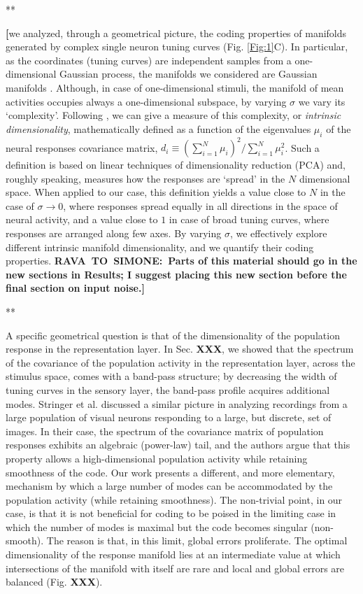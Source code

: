 \documentclass[a4paper]{article}%
\begin{document}
**

\textbf{[}we analyzed, through a geometrical picture, the coding properties of
manifolds generated by complex single neuron tuning curves (Fig.
\ref{Fig:1}C). In particular, as the coordinates (tuning curves) are
independent samples from a one-dimensional Gaussian process, the manifolds we
considered are Gaussian manifolds \cite{Lahiri2016RandomManifolds}. Although,
in case of one-dimensional stimuli, the manifold of mean activities occupies
always a one-dimensional subspace, by varying $\sigma$ we vary its
`complexity'. Following \cite{Gao2017AMeasurement}, we can give a measure of
this complexity, or \emph{intrinsic dimensionality}, mathematically defined as
a function of the eigenvalues $\mu_{i}$ of the neural responses covariance
matrix, $d_{i}\equiv(\sum_{i=1}^{N}\mu_{i})^{2}/\sum_{i=1}^{N}\mu_{i}^{2}$.
Such a definition is based on linear techniques of dimensionality reduction
(PCA) and, roughly speaking, measures how the responses are `spread' in the
$N$ dimensional space. When applied to our case, this definition yields a
value close to $N$ in the case of $\sigma\rightarrow0$, where responses spread
equally in all directions in the space of neural activity, and a value close
to $1$ in case of broad tuning curves, where responses are arranged along few
axes. By varying $\sigma$, we effectively explore different intrinsic manifold
dimensionality, and we quantify their coding properties.
\textbf{RAVA\ TO\ SIMONE:\ Parts of this material should go in the new
sections in Results; I suggest placing this new section before the final
section on input noise.]}

**

A specific geometrical question is that of the dimensionality of the
population response in the representation layer. In Sec. \textbf{XXX}, we
showed that the spectrum of the covariance of the population activity in the
representation layer, across the stimulus space, comes with a band-pass
structure; by decreasing the width of tuning curves in the sensory layer, the
band-pass profile acquires additional modes. Stringer et al.
\cite{Stringer2019HighCortex} discussed a similar picture in analyzing
recordings from a large population of visual neurons responding to a large,
but discrete, set of images. In their case, the spectrum of the covariance
matrix of population responses exhibits an algebraic (power-law) tail, and the
authors argue that this property allows a high-dimensional population activity
while retaining smoothness of the code. Our work presents a different, and
more elementary, mechanism by which a large number of modes can be
accommodated by the population activity (while retaining smoothness). The
non-trivial point, in our case, is that it is not beneficial for coding to be
poised in the limiting case in which the number of modes is maximal but the
code becomes singular (non-smooth). The reason is that, in this limit, global
errors proliferate. The optimal dimensionality of the response manifold lies
at an intermediate value at which intersections of the manifold with itself
are rare and local and global errors are balanced (Fig. \textbf{XXX}).
\end{document}
